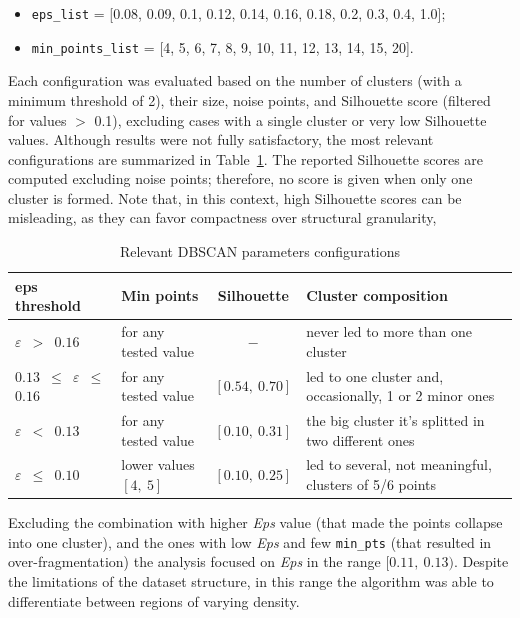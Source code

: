 \begin{itemize}
    \item \texttt{eps\_list} =  [0.08, 0.09, 0.1, 0.12, 0.14, 0.16, 0.18, 0.2, 0.3, 0.4, 1.0];
    \item \texttt{min\_points\_list} =  [4, 5, 6, 7, 8, 9, 10, 11, 12, 13, 14, 15, 20].
\end{itemize}
Each configuration was evaluated based on the number of clusters (with a minimum threshold of 2), their size, noise points, and Silhouette score 
(filtered for values $>$ 0.1), excluding cases with a single cluster or very low Silhouette values.
Although results were not fully satisfactory, the most relevant configurations are summarized in Table~\ref{tab:eps}. 
The reported Silhouette scores are computed excluding noise points; therefore, no score is given when only one cluster is formed. 
Note that, in this context, high Silhouette scores can be misleading, as they can favor compactness over structural granularity,
\begin{table}[h]
\centering
\begin{tabular}{llcl}
\toprule
\textbf{eps threshold} & \textbf{Min points} & \textbf{Silhouette} & \textbf{Cluster composition}  \\
\midrule
\texttt{\textbf{$\varepsilon$} $>$ $0.16$} & for any tested value & \texttt{$-$} & never led to more than one cluster \\
\texttt{$0.13$ $\leq$ \textbf{$\varepsilon$} $\leq$ $0.16$} & for any tested value &  $[0.54,\ 0.70]$  & led to one cluster and, occasionally, 1 or 2 minor ones\\
\texttt{\textbf{$\varepsilon$} $<$ $0.13$}& for any tested value & $[0.10,\ 0.31]$ & the big cluster it's splitted in two different ones \\
\texttt{\textbf{$\varepsilon$} $\leq$ $0.10$} & lower values $[4,\ 5]$& $[0.10,\ 0.25]$  & led to several, not meaningful, clusters of 5/6 points\\
\bottomrule
\end{tabular}
\caption{Relevant DBSCAN parameters configurations}
\label{tab:eps}
\end{table}

Excluding the combination with higher \textit{Eps} value (that made the points collapse into one cluster), and the ones with low \textit{Eps} and few \texttt{min\_pts} (that resulted in over-fragmentation)
the analysis focused on \textit{Eps} in the range $[0.11,\ 0.13)$.
Despite the limitations of the dataset structure, in this range the algorithm was able to differentiate between regions of varying density.

